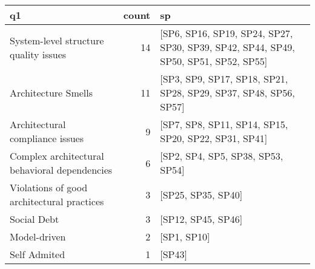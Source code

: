 \begin{tabular}{lrl}
\toprule
                                            q1 &  count &                                                                                   sp \\
\midrule
         System-level structure quality issues &     14 &  [SP6, SP16, SP19, SP24, SP27, SP30, SP39, SP42, SP44, SP49, SP50, SP51, SP52, SP55] \\
                           Architecture Smells &     11 &                     [SP3, SP9, SP17, SP18, SP21, SP28, SP29, SP37, SP48, SP56, SP57] \\
               Architectural compliance issues &      9 &                                 [SP7, SP8, SP11, SP14, SP15, SP20, SP22, SP31, SP41] \\
 Complex architectural behavioral dependencies &      6 &                                                    [SP2, SP4, SP5, SP38, SP53, SP54] \\
    Violations of good architectural practices &      3 &                                                                   [SP25, SP35, SP40] \\
                                   Social Debt &      3 &                                                                   [SP12, SP45, SP46] \\
                                  Model-driven &      2 &                                                                          [SP1, SP10] \\
                                  Self Admited &      1 &                                                                               [SP43] \\
\bottomrule
\end{tabular}
